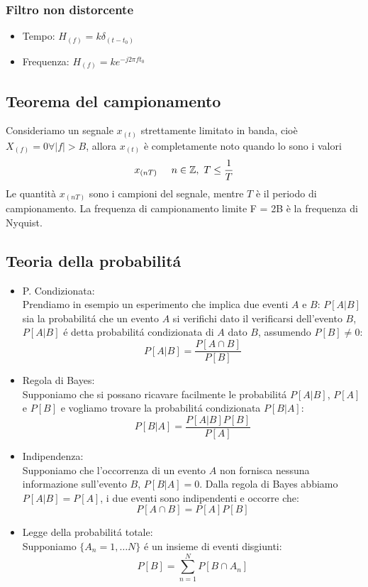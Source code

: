         \subsubsection{Filtro non distorcente}
            \begin{itemize}
                \item {Tempo: $H_{(f)} = k\delta_{(t-t_0)}$}
                \item {Frequenza: $H_{(f)} = ke^{-j2\pi ft_0}$}
            \end{itemize}
    \subsection{Teorema del campionamento}
        Consideriamo un segnale $x_{(t)}$ strettamente limitato in banda, cioè $X_{(f)} = 0 \forall |f|>B$, allora
        $x_{(t)}$ è completamente noto quando lo sono i valori
        \[
            x_{(nT)} \hspace{0.5cm} n\in\mathbb{Z},\ T\leq \frac{1}{T}  
        \]
        Le quantità $x_{(nT)}$ sono i campioni del segnale, mentre $T$ è il periodo di campionamento. La frequenza di
        campionamento limite F = 2B è la frequenza di Nyquist.

    \subsection{Teoria della probabilitá}
        \begin{itemize}
            \item {P. Condizionata:\\
                Prendiamo in esempio un esperimento che implica due eventi $A$ e $B$: $P[A|B]$ sia la probabilitá che un evento $A$ si verifichi
                dato il verificarsi dell'evento $B$, $P[A|B]$ é detta probabilitá condizionata di $A$ dato $B$, assumendo $P[B]\neq 0$:
                \[
                    P[A|B] = \frac{P[A\cap B]}{P[B]}
                \]
            }
            \item {Regola di Bayes:\\
                Supponiamo che si possano ricavare facilmente le probabilitá $P[A|B]$, $P[A]$ e $P[B]$ e vogliamo trovare la probabilitá condizionata $P[B|A]$:
                \[
                    P[B|A] = \frac{P[A|B]P[B]}{P[A]}   
                \]
            }
            \item {Indipendenza:\\
                Supponiamo che l'occorrenza  di un evento $A$ non fornisca nessuna informazione sull'evento $B$, $P[B|A] = 0$. Dalla regola di Bayes abbiamo $P[A|B] = P[A]$,
                i due eventi sono indipendenti e occorre che:
                \[
                    P[A\cap B] = P[A]P[B]    
                \]
            }
            \item {Legge della probabilitá totale:\\
                Supponiamo $\{ A_n = 1,\dots N\}$ é un insieme di eventi disgiunti:
                \[
                    P[B] = \sum_{n=1}^{N}P[B\cap A_n]    
                \]
            }
        \end{itemize}
